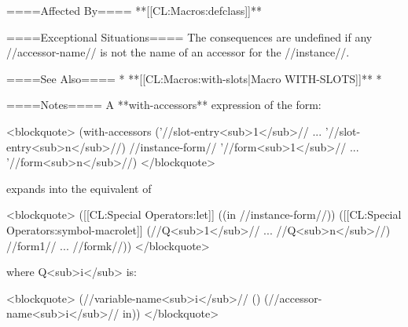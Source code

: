 ====Affected By====
**[[CL:Macros:defclass]]**

====Exceptional Situations====
The consequences are undefined if any //accessor-name// is not the name of an accessor for the //instance//.

====See Also====
  * **[[CL:Macros:with-slots|Macro WITH-SLOTS]]**
  * 

====Notes====
A **with-accessors** expression of the form:

<blockquote>
(with-accessors ('//slot-entry<sub>1</sub>// ... '//slot-entry<sub>n</sub>//) 
    //instance-form// 
  '//form<sub>1</sub>// ... '//form<sub>n</sub>//)
</blockquote>

expands into the equivalent of

<blockquote>
([[CL:Special Operators:let]] ((in //instance-form//))
  ([[CL:Special Operators:symbol-macrolet]] (//Q<sub>1</sub>// ... //Q<sub>n</sub>//) 
    //form1// ... //formk//))
</blockquote>

where Q<sub>i</sub> is:

<blockquote>
 (//variable-name<sub>i</sub>// () (//accessor-name<sub>i</sub>// in))
</blockquote>

